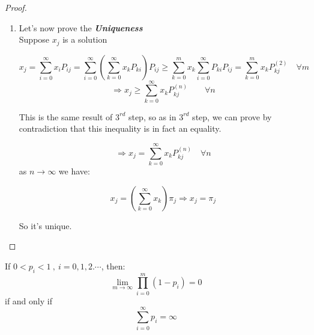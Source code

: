 \begin{proof}
\begin{enumerate}
			\item
			Let's now prove the \textbf{\textit{Uniqueness}} \\
			Suppose $x_j$ is a solution

			$$x_j =
			 \sum_{i=0}^\infty x_i P_{ij} =
			 \sum_{i=0}^\infty ( \sum_{k=0}^\infty x_k P_{ki} ) P_{ij} \geq
			 \sum_{k=0}^m x_k \sum_{i=0}^\infty P_{ki} P_{ij} =
			 \sum_{k=0}^m x_k P_{kj}^{(2)}
			 \quad \forall m$$
			$$ \Rightarrow x_j \geq \sum_{k=0}^\infty x_k P_{kj}^{(n)}\qquad \forall n $$

			This is the same result of $3^{rd}$ step, so as in $3^{rd}$ step, we can prove by contradiction that this inequality is in fact an equality.

			$$\Rightarrow x_j = \sum_{k=0}^\infty x_k P_{kj}^{(n)} \quad \forall n$$
			as $n \to \infty$ we have:
			
			\begin{equation}
				x_j = (\sum_{k=0}^\infty x_k ) \pi_j \Rightarrow x_j = \pi_j
			\end{equation}
			
			So it's unique.
		\end{enumerate}
	\end{proof}

	\begin{lemma}
	  If $0 < p_i < 1 ~,~ i=0,1,2.\cdots $, then:
		\begin{equation}\label{limprodpi}
			\lim_{m \to \infty} \prod_{i=0}^{m}(1-p_i) = 0
		\end{equation}
		if and only if
		\begin{equation}\label{pitoinfty}
			\sum_{i=0}^\infty p_i = \infty
		\end{equation}
	\end{lemma}

